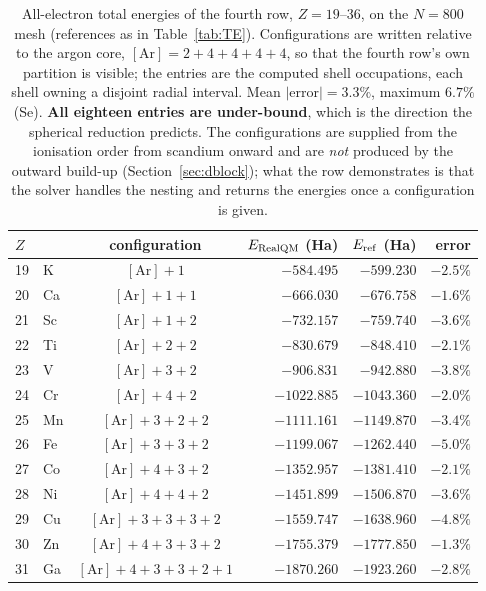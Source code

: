 \documentclass[11pt]{article}
\begin{document}
\begin{table}[t]
\centering
\caption{All-electron total energies of the fourth row, $Z=19$--$36$, on the $N=800$ mesh
(references as in Table~\ref{tab:TE}). Configurations are written relative to the argon core,
$[\mathrm{Ar}]=2{+}4{+}4{+}4{+}4$, so that the fourth row's own partition is visible; the entries are
the computed shell occupations, each shell owning a disjoint radial interval.
Mean $|\mathrm{error}|=3.3\%$, maximum $6.7\%$ (Se).
\textbf{All eighteen entries are under-bound}, which is the direction the spherical reduction
predicts. The configurations are supplied from the ionisation order from scandium onward and are
\emph{not} produced by the outward build-up (Section~\ref{sec:dblock}); what the row demonstrates is
that the solver handles the nesting and returns the energies once a configuration is given.}
\label{tab:TE4}
\begin{tabular}{llcrrr}
\toprule
$Z$ & & configuration & $E_{\rm RealQM}$ (Ha) & $E_{\rm ref}$ (Ha) & error \\
\midrule
19 & K & $[\mathrm{Ar}]{+}1$ & $-584.495$ & $-599.230$ & $-2.5\%$ \\
20 & Ca & $[\mathrm{Ar}]{+}1{+}1$ & $-666.030$ & $-676.758$ & $-1.6\%$ \\
21 & Sc & $[\mathrm{Ar}]{+}1{+}2$ & $-732.157$ & $-759.740$ & $-3.6\%$ \\
22 & Ti & $[\mathrm{Ar}]{+}2{+}2$ & $-830.679$ & $-848.410$ & $-2.1\%$ \\
23 & V & $[\mathrm{Ar}]{+}3{+}2$ & $-906.831$ & $-942.880$ & $-3.8\%$ \\
24 & Cr & $[\mathrm{Ar}]{+}4{+}2$ & $-1022.885$ & $-1043.360$ & $-2.0\%$ \\
25 & Mn & $[\mathrm{Ar}]{+}3{+}2{+}2$ & $-1111.161$ & $-1149.870$ & $-3.4\%$ \\
26 & Fe & $[\mathrm{Ar}]{+}3{+}3{+}2$ & $-1199.067$ & $-1262.440$ & $-5.0\%$ \\
27 & Co & $[\mathrm{Ar}]{+}4{+}3{+}2$ & $-1352.957$ & $-1381.410$ & $-2.1\%$ \\
28 & Ni & $[\mathrm{Ar}]{+}4{+}4{+}2$ & $-1451.899$ & $-1506.870$ & $-3.6\%$ \\
29 & Cu & $[\mathrm{Ar}]{+}3{+}3{+}3{+}2$ & $-1559.747$ & $-1638.960$ & $-4.8\%$ \\
30 & Zn & $[\mathrm{Ar}]{+}4{+}3{+}3{+}2$ & $-1755.379$ & $-1777.850$ & $-1.3\%$ \\
31 & Ga & $[\mathrm{Ar}]{+}4{+}3{+}3{+}2{+}1$ & $-1870.260$ & $-1923.260$ & $-2.8\%$ \\

\end{tabular}
\end{table}
\end{document}
